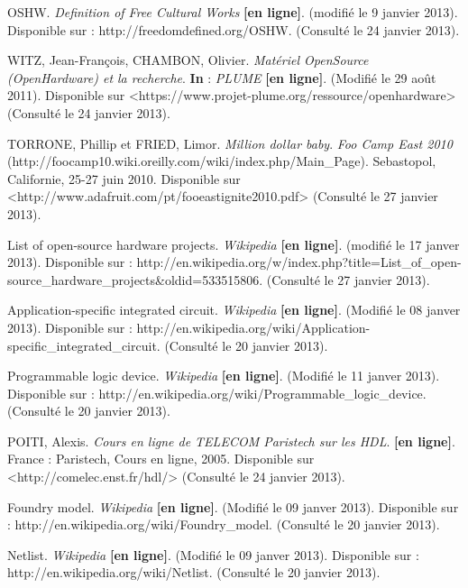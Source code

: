 \documentclass{report}
\begin{document}
\begin{thebibliography}{1}
OSHW. \textit{Definition of Free Cultural Works} \textbf{[en ligne]}. (modifié le 9 janvier 2013). Disponible sur : http://freedomdefined.org/OSHW. (Consulté le 24 janvier 2013).

WITZ, Jean-François, CHAMBON, Olivier. \textit{Matériel OpenSource (OpenHardware) et la recherche}. \textbf{In} : \textit{PLUME} \textbf{[en ligne]}. (Modifié le 29 août 2011). Disponible sur <https://www.projet-plume.org/ressource/openhardware> (Consulté le 24 janvier 2013).

TORRONE, Phillip et FRIED, Limor. \textit{Million dollar baby}. \textit{Foo Camp East 2010} (http://foocamp10.wiki.oreilly.com/wiki/index.php/Main\_Page). Sebastopol, Californie, 25-27 juin 2010. Disponible sur <http://www.adafruit.com/pt/fooeastignite2010.pdf> (Consulté le 27 janvier 2013).

List of open-source hardware projects. \textit{Wikipedia} \textbf{[en ligne]}. (modifié le 17 janver 2013). Disponible sur : http://en.wikipedia.org/w/index.php?title=List\_of\_open-source\_hardware\_projects\&oldid=533515806. (Consulté le 27 janvier 2013).



Application-specific integrated circuit. \textit{Wikipedia} \textbf{[en ligne]}. (Modifié le 08 janver 2013). Disponible sur : http://en.wikipedia.org/wiki/Application-specific\_integrated\_circuit. (Consulté le 20 janvier 2013).

Programmable logic device. \textit{Wikipedia} \textbf{[en ligne]}. (Modifié le 11 janver 2013). Disponible sur : http://en.wikipedia.org/wiki/Programmable\_logic\_device. (Consulté le 20 janvier 2013).

POITI, Alexis. \textit{Cours en ligne de {TELECOM} Paristech sur les {HDL}}. \textbf{[en ligne]}. France : Paristech, Cours en ligne, 2005. Disponible sur <http://comelec.enst.fr/hdl/> (Consulté le 24 janvier 2013).

Foundry model. \textit{Wikipedia} \textbf{[en ligne]}. (Modifié le 09 janver 2013). Disponible sur : http://en.wikipedia.org/wiki/Foundry\_model. (Consulté le 20 janvier 2013).

Netlist. \textit{Wikipedia} \textbf{[en ligne]}. (Modifié le 09 janver 2013). Disponible sur : http://en.wikipedia.org/wiki/Netlist. (Consulté le 20 janvier 2013).


\end{thebibliography}
\end{document}
